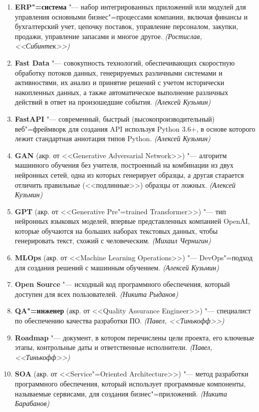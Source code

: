\documentclass[14pt, a4paper]{extarticle}
\begin{document}
\begin{enumerate}
    \item \textbf{ERP"=система} "--- набор интегрированных приложений или модулей для управления основными бизнес"=процессами компании, включая финансы и бухгалтерский учет, цепочку поставок, управление персоналом, закупки, продажи, управление запасами и многое другое. \textit{(Ростислав, <<Сибинтек>>)}
    \item \textbf{Fast Data}  "--- совокупность технологий, обеспечивающих скоростную обработку потоков данных, генерируемых различными системами и активностями, их анализ и принятие решений с учетом исторически накопленных данных, а также автоматическое выполнение различных действий в ответ на произошедшие события. \textit{(Алексей Кузьмин)}
    \item \textbf{FastAPI} "--- современный, быстрый (высокопроизводительный) веб"=фреймворк для создания API используя Python 3.6+, в основе которого лежит стандартная аннотация типов Python. \textit{(Алексей Кузьмин)}
    \item \textbf{GAN} (акр. от <<Generative Adversarial Network>>) "--- алгоритм машинного обучения без учителя, построенный на комбинации из двух нейронных сетей, одна из которых генерирует образцы, а другая старается отличить правильные (<<подлинные>>) образцы от ложных. \textit{(Алексей Кузьмин)}
    \item \textbf{GPT} (акр. от <<Generative Pre"=trained Transformer>>) "--- тип нейронных языковых моделей, впервые представленных компанией OpenAI, которые обучаются на больших наборах текстовых данных, чтобы генерировать текст, схожий с человеческим. \textit{(Михаил Чернигин)}
    \item \textbf{MLOps} (акр. от <<Machine Learning Operations>>) "--- DevOps"=подход для создания решений с машинным обучением. \textit{(Алексей Кузьмин)}
    \item \textbf{Open Source} "--- исходный код программного обеспечения, который доступен для всех пользователей. \textit{(Никита Рыданов)}
    \item \textbf{QA"=инженер} (акр. от <<Quality Assurance Engineer>>) "--- специалист по обеспечению качества разработки ПО. \textit{(Павел, <<Тинькофф>>)}
    \item \textbf{Roadmap} "--- документ, в котором перечислены цели проекта, его ключевые этапы, контрольные даты и ответственные исполнители. \textit{(Павел, <<Тинькофф>>)}
    \item \textbf{SOA} (акр. от <<Service"=Oriented Architecture>>) "--- метод разработки программного обеспечения, который использует программные компоненты, называемые сервисами, для создания бизнес"=приложений. \textit{(Никита Барабанов)}

\end{enumerate}
\end{document}
